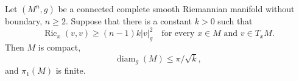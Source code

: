 Let \((M^n,g)\) be a connected complete smooth Riemannian manifold without boundary, \(n\ge2\). Suppose that there is a constant \(k>0\) such that
\[
\operatorname{Ric}_x(v,v)\ge(n-1)k|v|_g^2\quad\text{for every }x\in M\text{ and }v\in T_xM.
\]
Then \(M\) is compact,
\[
\operatorname{diam}_g(M)\le\pi/\sqrt{k},
\]
and \(\pi_1(M)\) is finite.